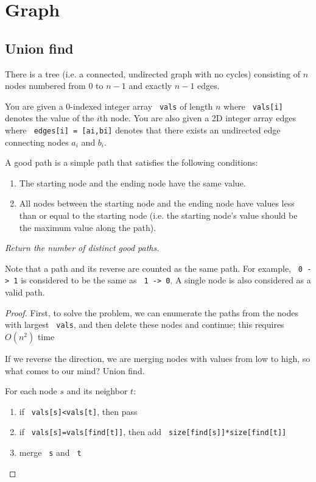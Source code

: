 \documentclass[11pt]{article}
\let\OldTexttt\texttt
\renewcommand{\texttt}[1]{\OldTexttt{\color{MidnightBlue} #1}}
\begin{document}
\section{Graph}
\label{sec:org57a33e6}
\subsection{Union find}
\label{sec:orgf58b309}
\begin{problem}
There is a tree (i.e. a connected, undirected graph with no cycles) consisting of \(n\) nodes
numbered from 0 to \(n-1\) and exactly \(n - 1\) edges.

You are given a 0-indexed integer array \texttt{vals} of length \(n\) where \texttt{vals[i]} denotes the value of the
\(i\)th node. You are also given a 2D integer array edges where \texttt{edges[i] = [ai,bi]} denotes that
there exists an undirected edge connecting nodes \(a_i\) and \(b_i\).

A good path is a simple path that satisfies the following conditions:
\begin{enumerate}
\item The starting node and the ending node have the same value.
\item All nodes between the starting node and the ending node have values less than or equal to the
starting node (i.e. the starting node's value should be the maximum value along the path).
\end{enumerate}

\emph{Return the number of distinct good paths.}

Note that a path and its reverse are counted as the same path. For example, \texttt{0 -> 1} is considered
to be the same as \texttt{1 -> 0}. A single node is also considered as a valid path.
\end{problem}

\begin{proof}
First, to solve the problem, we can enumerate the paths from the nodes with largest \texttt{vals}, and
then delete these nodes and continue; this requires \(O(n^2)\) time

If we reverse the direction, we are merging nodes with values from low to high, so what comes to
our mind? Union find.

For each node \(s\) and its neighbor \(t\):
\begin{enumerate}
\item if \texttt{vals[s]<vals[t]}, then pass
\item if \texttt{vals[s]=vals[find[t]]}, then add \texttt{size[find[s]]*size[find[t]]}
\item merge \texttt{s} and \texttt{t}
\end{enumerate}
\end{proof}
\end{document}
